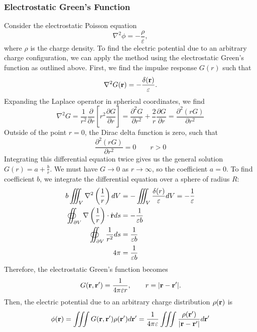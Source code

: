 \subsubsection{Electrostatic Green's Function}
Consider the electrostatic Poisson equation
\begin{equation}
	\nabla^2 \phi = -\frac{\rho}{\varepsilon},
\end{equation}
where $\rho$ is the charge density. To find the electric potential due to an arbitrary charge configuration, we can apply the method using the electrostatic Green's function as outlined above. First, we find the impulse response $G(r)$ such that
\begin{equation}
	\nabla^2 G(\mathbf{r}) = -\frac{\delta(\mathbf{r})}{\varepsilon}.
\end{equation}
Expanding the Laplace operator in spherical coordinates, we find
\begin{equation*}
	\nabla^2 G = \frac{1}{r^2} \frac{\partial}{\partial r} \left[ r^2 \frac
	{\partial G}{\partial r} \right] = \frac{\partial^2 G}{\partial r^2} + \frac{2}{r} \frac{\partial G}{\partial r} = \frac{\partial^2 (r G)}{\partial r^2}
\end{equation*}
Outside of the point $r = 0$, the Dirac delta function is zero, such that
\begin{equation}
	\frac{\partial^2 (r G)}{\partial r^2} = 0 \qquad r > 0
\end{equation}
Integrating this differential equation twice gives us the general solution $G(r) = a + \frac{b}{r}$. We must have $G \to 0$ as $r \to \infty$, so the coefficient $a = 0$. To find coefficient $b$, we integrate the differential equation over a sphere of radius $R$:
\begin{align*}
	b \iiint_{V} \nabla^2 \left( \frac{1}{r} \right) dV & = - \iiint_V \frac{\delta(r)}{\varepsilon} dV = -\frac{1}{\varepsilon} \\
	\oiint_{\partial V} \nabla \left( \frac{1}{r} \right) \cdot \hat{\mathbf{r}} ds & = -\frac{1}{\varepsilon b} \\
	\oiint_{\partial V} \frac{1}{r^2} ds & = \frac{1}{\varepsilon b} \\
	4\pi & = \frac{1}{\varepsilon b}
\end{align*}
Therefore, the electrostatic Green's function becomes
\begin{equation}
	G(\mathbf{r}, \mathbf{r}^\prime) = \frac{1}{4\pi \varepsilon r}, \qquad r = |\mathbf{r} - \mathbf{r}^\prime|.
\end{equation}
Then, the electric potential due to an arbitrary charge distribution $\rho(\mathbf{r})$ is 
\begin{equation}
	\phi(\mathbf{r}) = \iiint G(\mathbf{r}, \mathbf{r}^\prime) \rho(\mathbf{r}^\prime) d\mathbf{r}^\prime = \frac{1}{4\pi\varepsilon} \iiint \frac{\rho(\mathbf{r}^\prime)}{|\mathbf{r} - \mathbf{r}^\prime|} d\mathbf{r}^\prime
\end{equation}

